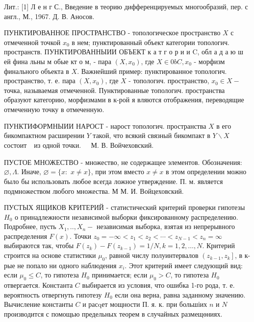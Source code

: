 \documentclass[10pt]{article}
\begin{document}
Лит.: [1] Л е н г С., Введение в теорию дифференцируемых многообразий, пер. с англ., М., 1967. Д. В. Аносов.



ПУНКТИРОВАННОЕ ПРОСТРАНСТВО - топологическое пространство $X$ с отмеченной точкой $x_{0}$ в нем; пунктированный объект категории топологич. пространств. ПУНКТИРОВАННЫИИ ОБЪЕКТ к а т г о р и и C, обл а д а ю ш ей фина льны м обые кт о м, - пара $\left(X, x_{0}\right)$, где $X \in 0 b C, x_{0}$ - морфизм финального объекта в $X$. Важнейший пример: пунктированное топологич. пространство, т. е. пара $\left(X, x_{0}\right)$, где $X$ - топологич. пространство, $x_{0} \in X-$ точка, называемая отмеченной. Пунктированные топологич. пространства образуют категорию, морфизмами в к-рой я вляются отображения, переводящие отмеченную точку в отмеченную.



ПУНКТИФОРМНЫИИ НАРОСТ - нарост топологич. пространства $X$ в его бикомпактном расширении $Y$ такой, что всякий связный бикомпакт в $Y \backslash X$ состоит $\begin{array}{ll}\text { из одной точки. } & \text { М. В. Войчеховский. }\end{array}$



ПУСТОЕ МНОЖЕСТВО - множество, не содержащее элементов. Обозначения: $\varnothing, \Lambda$. Иначе, $\varnothing=\{x:$ $x \neq x\}$, при этом вместо $x \neq x$ в этом определении можно было бы использовать любое всегда ложное утверждение. П. м. является подмножеством любого множества. М М. И. Войцеховский.



ПУСТЫХ ЯЩИКОВ КРИТЕРИЙ - статистический критерий проверки гипотезы $H_{0}$ о принадлежности независимой выборки фиксированному распределению. Подробнее, пусть $X_{1}, . ., X_{n}-$ независимая выборка, взятая из непрерывного распределения $F(x)$. Точки $z_{0}=-\infty<z_{1}<z_{2}<\cdots<z_{N-1}<z_{n}=\infty$ выбираются так, чтобы $F\left(z_{k}\right)-F\left(z_{k-1}\right)=1 / N, k=1,2, \ldots, N$. Критерий строится на основе статистики $\mu_{0}$, равной числу полуинтервалов $\left(z_{k-1}, z_{k}\right]$, в к-рые не попало ни одного наблюдения $x_{i}$. Этот критерий имеет следующий вид: если $\mu_{0} \leqslant C$, то гипотеза $H_{0}$ принимается; если $\mu_{0}>C$, то гипотеза $H_{0}$ отвергается. Константа $C$ выбирается из условия, что ошибка 1-го рода, т. е. вероятность отвергнуть гипотезу $H_{0}$ если она верна, равна заданному значению. Вычисление константы $C$ и расqет мощности П. я. к. при большіих $n$ и $N$ производится с помощью предельных теорем в случайных размещөниях.
\end{document}
